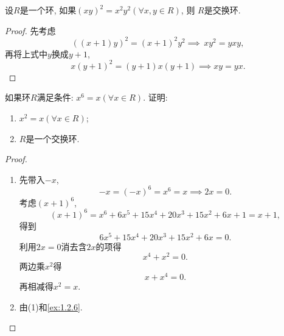 \begin{problem}
    设$R$是一个环, 如果$(xy)^2 = x^2y^2 (\forall x, y \in R)$, 则
$R$是交换环.
\end{problem}

\begin{proof}
    先考虑
    \[
        ((x + 1)y)^2 = (x + 1)^2y^2 \implies\, xy^2 = yxy,
    \]
    再将上式中$y$换成$y + 1$,
    \[
        x(y + 1)^2 = (y + 1)x(y + 1) \implies xy = yx.
    \]
\end{proof}

\begin{problem}
    如果环$R$满足条件: $x^6 = x (\forall x \in R)$. 证明: 
\begin{enumerate}[(1)]
    \item $x^2 = x (\forall x \in R)$;
    \item $R$是一个交换环.
\end{enumerate}
\end{problem}

\begin{proof}
\begin{enumerate}[(1)]
    \item 先带入$-x$,
\[
    -x = (-x)^6 = x^6 = x \implies 2x = 0.
\]
    考虑$(x + 1)^6$,
\[
    (x + 1)^6 = x^6 + 6x^5 + 15x^4 + 20x^3 + 15x^2 + 6x + 1 = x + 1,
\]
得到
\[
    6x^5 + 15x^4 + 20x^3 + 15x^2 + 6x = 0.
\]
利用$2x = 0$消去含$2x$的项得
\[
    x^4 + x^2 = 0.
\]
两边乘$x^2$得
\[
    x + x^4 = 0.
\]
再相减得$x^2 = x$.
    \item 由(1)和\ref{ex:1.2.6}.
\end{enumerate}
\end{proof}